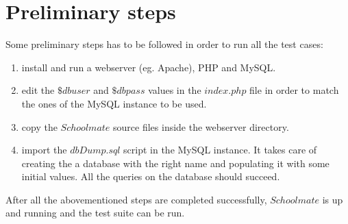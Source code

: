 \documentclass{sig-alternate-05-2015}
\begin{document}
\section{Preliminary steps}\label{steps}
Some preliminary steps has to be followed in order to run all the test cases:
\begin{enumerate}
    \item install and run a webserver (eg. Apache), PHP and MySQL.
    \item edit the $\$dbuser$ and $\$dbpass$ values in the $index.php$ file in order
        to match the ones of the MySQL instance to be used.
    \item copy the $Schoolmate$ source files inside the webserver directory.
    \item import the $dbDump.sql$ script in the MySQL instance. It takes care of creating
        the a database with the right name and populating it with some initial values.
        All the queries on the database should succeed.
\end{enumerate}
After all the abovementioned steps are completed successfully, $Schoolmate$ is up and running
and the test suite can be run.


%

%

%
%
\end{document}
